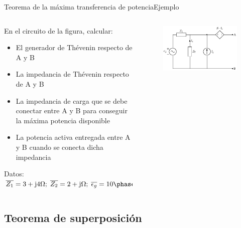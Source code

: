 \documentclass[aspectratio=169, xcolor={usenames,svgnames,dvipsnames}]{beamer}
\begin{document}
\begin{frame}{Teorema de la máxima transferencia de potencia}{Ejemplo}

\begin{columns}
\begin{column}{0.6\linewidth}
En el circuito de la figura, calcular:
\begin{itemize}
\item El generador de Thévenin respecto de A y B
\item La impedancia de Thévenin respecto de A y B
\item La impedancia de carga que se debe conectar entre A y B para conseguir la máxima potencia disponible
\item La potencia activa entregada entre A y B cuando se conecta dicha impedancia
\end{itemize}
Datos: $\overline{Z_1} = 3 + \mathrm{j}4\Omega;\; \overline{Z_2} = 2 + \mathrm{j}\Omega;\; \overline{\epsilon_g} = 10\phase{30^{\circ}}\;V; \; \overline{I_g} = 2\phase{15^{\circ}}\, A;\; \beta = 5 \Omega$
\end{column}
\begin{column}{0.4\linewidth}
\begin{figure}[H]
    \centering
    \includegraphics[width=\linewidth]{../figs/thevenin6.pdf}
\end{figure}
\end{column}
\end{columns}

\end{frame}

\subsection{Teorema de superposición} 
\end{document}
